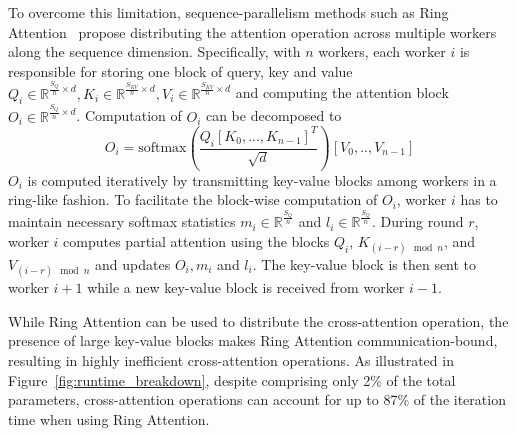 To overcome this limitation, sequence-parallelism methods such as Ring Attention~\cite{liu2024ring} propose distributing the attention operation across multiple workers along the sequence dimension. Specifically, with $n$ workers, each worker $i$ is responsible for storing one block of query, key and value $Q_i\in \mathbb{R}^{\frac{S_{Q}}{n} \times d}, K_i \in \mathbb{R}^{\frac{S_{KV}}{n} \times d}, V_i \in \mathbb{R}^{\frac{S_{KV}}{n} \times d}$ and computing the attention block $O_i \in \mathbb{R}^{\frac{S_Q}{n} \times d}$. Computation of $O_i$ can be decomposed to
\begin{equation*} \label{eqn:ring-attn}
  O_i = \text{softmax}(\frac{Q_i[K_0, ..., K_{n-1}]^T}{\sqrt{d}})[V_0, .., V_{n-1}]
\end{equation*}
$O_i$ is computed iteratively by transmitting key-value blocks among workers in a ring-like fashion. To facilitate the block-wise computation of $O_i$, worker $i$ has to maintain necessary softmax statistics $m_i \in \mathbb{R}^{\frac{S_Q}{n}}$ and $l_i \in \mathbb{R}^{\frac{S_Q}{n}}$. During round $r$, worker $i$ computes partial attention using the blocks $Q_i$, $K_{(i-r) \mod n}$, and $V_{(i-r) \mod n}$ and updates $O_i, m_i$ and $l_i$. The key-value block is then sent to worker $i+1$ while a new key-value block is received from worker $i-1$.

While Ring Attention can be used to distribute the cross-attention operation, the presence of large key-value blocks makes Ring Attention communication-bound, resulting in highly inefficient cross-attention operations. As illustrated in Figure~\ref{fig:runtime_breakdown}, despite comprising only 2\% of the total parameters, cross-attention operations can account for up to 87\% of the iteration time when using Ring Attention.










